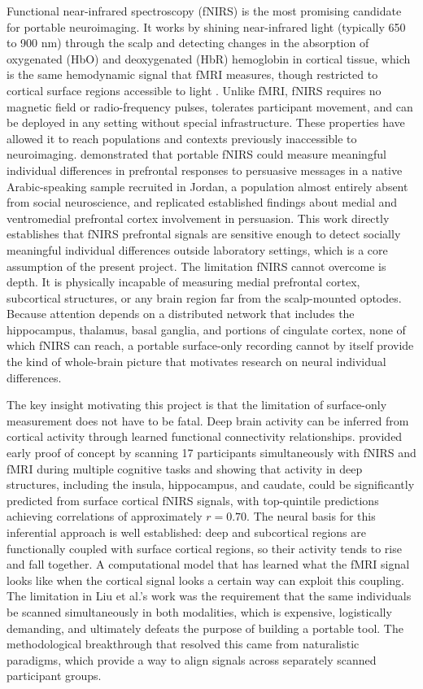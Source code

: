 Functional near-infrared spectroscopy (fNIRS) is the most promising candidate for portable neuroimaging. It works by shining near-infrared light (typically 650 to 900 nm) through the scalp and detecting changes in the absorption of oxygenated (HbO) and deoxygenated (HbR) hemoglobin in cortical tissue, which is the same hemodynamic signal that fMRI measures, though restricted to cortical surface regions accessible to light \citep{kamran2016}. Unlike fMRI, fNIRS requires no magnetic field or radio-frequency pulses, tolerates participant movement, and can be deployed in any setting without special infrastructure. These properties have allowed it to reach populations and contexts previously inaccessible to neuroimaging. \citet{burns2019} demonstrated that portable fNIRS could measure meaningful individual differences in prefrontal responses to persuasive messages in a native Arabic-speaking sample recruited in Jordan, a population almost entirely absent from social neuroscience, and replicated established findings about medial and ventromedial prefrontal cortex involvement in persuasion. This work directly establishes that fNIRS prefrontal signals are sensitive enough to detect socially meaningful individual differences outside laboratory settings, which is a core assumption of the present project. The limitation fNIRS cannot overcome is depth. It is physically incapable of measuring medial prefrontal cortex, subcortical structures, or any brain region far from the scalp-mounted optodes. Because attention depends on a distributed network that includes the hippocampus, thalamus, basal ganglia, and portions of cingulate cortex, none of which fNIRS can reach, a portable surface-only recording cannot by itself provide the kind of whole-brain picture that motivates research on neural individual differences.

The key insight motivating this project is that the limitation of surface-only measurement does not have to be fatal. Deep brain activity can be inferred from cortical activity through learned functional connectivity relationships. \citet{liu2015} provided early proof of concept by scanning 17 participants simultaneously with fNIRS and fMRI during multiple cognitive tasks and showing that activity in deep structures, including the insula, hippocampus, and caudate, could be significantly predicted from surface cortical fNIRS signals, with top-quintile predictions achieving correlations of approximately $r = 0.70$. The neural basis for this inferential approach is well established: deep and subcortical regions are functionally coupled with surface cortical regions, so their activity tends to rise and fall together. A computational model that has learned what the fMRI signal looks like when the cortical signal looks a certain way can exploit this coupling. The limitation in Liu et al.'s work was the requirement that the same individuals be scanned simultaneously in both modalities, which is expensive, logistically demanding, and ultimately defeats the purpose of building a portable tool. The methodological breakthrough that resolved this came from naturalistic paradigms, which provide a way to align signals across separately scanned participant groups.

